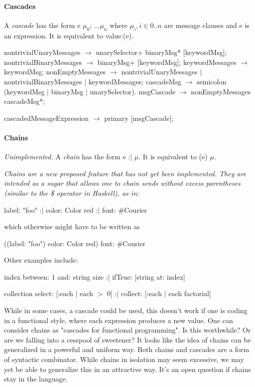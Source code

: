 \documentclass{article}
\newcommand{\code}[1]{{\sf #1}}
\begin{document}
\paragraph{Cascades}
\label{cascade}

A {\em cascade} has the form \code{e $\mu_0$; $\ldots \mu_n$} where $\mu_i, i \in 0 .. n$ are message clauses and \code{e} is an expression. It is equivalent to \code{[:p $|$ p $\mu_0$. $\ldots$ p $\mu_n$] value:(e)}.

\begin{newspeak}
nontrivialUnaryMessages $\rightarrow$ unarySelector+ binaryMsg*  [keywordMsg];
nontrivialBinaryMessages $\rightarrow$ binaryMsg+ [keywordMsg];
keywordMessages $\rightarrow$ keywordMsg;
nonEmptyMessages $\rightarrow$ nontrivialUnaryMessages $|$
                             nontrivialBinaryMessages  $|$
                             keywordMessages;
cascadeMsg $\rightarrow$ semicolon (keywordMsg $|$ binaryMsg $|$ unarySelector).
msgCascade $\rightarrow$ nonEmptyMessages cascadeMsg*;
                                                                                                                        
cascadedMessageExpression $\rightarrow$ primary [msgCascade];                                                                                                                   
\end{newspeak}

\paragraph{Chains}

{\it Unimplemented.} A {\em chain} has the form \code{e :$|$ $\mu$}. It is equivalent to \code{(e) $\mu$}.

{\it
Chains are a new proposed feature that has not yet been implemented. They are intended as a sugar that allows one to chain sends without excess parentheses (similar to the \$ operator in Haskell), as in:

\code{label: "foo" :$|$ color: Color red :$|$ font: \#Courier}

which otherwise might have to be written as

\code{((label: "foo") color: Color red) font: \#Courier}

Other examples include:

\code{index between: 1 and: string size :$|$ ifTrue: [string at: index]}

\code{ collection select: [:each $|$ each $>$ 0] :$|$ collect: [:each $|$ each factorial]}

While in some cases, a cascade could be used, this doesn't work if one is coding in a functional style, where each expression produces a new value. One can consider chains as "cascades for functional programming".
Is this worthwhile? Or are we falling into a cesspool of sweetener? It looks like the idea of chains can be generalized in a powerful and uniform way. Both chains and cascades are a form of syntactic combinator. While chains in isolation may seem excessive, we may yet be able to generalize this in an attractive way. It's an open question if chains stay in the language.
}
\end{document}
